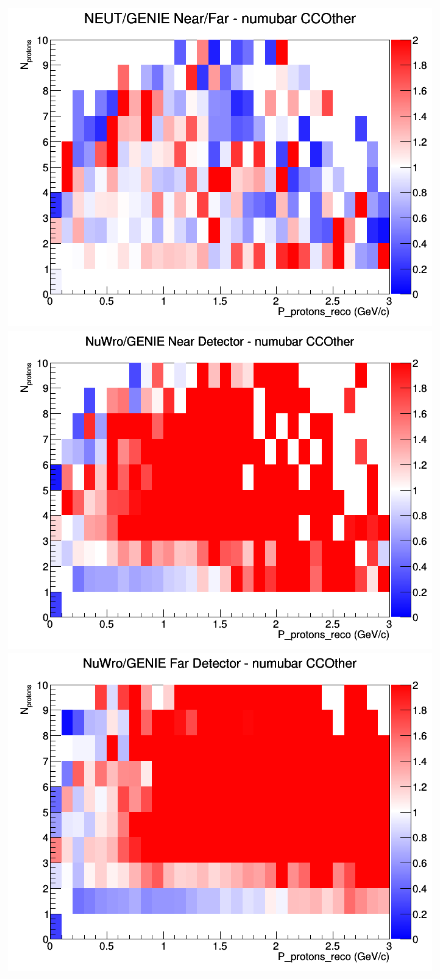 \documentclass[12pt]{article}
\begin{document}
\begin{figure}[h]
\endminipage
{}
\includegraphics[width=\linewidth]{eff_N_P/LAr/protons/ratios/CCOther_NEUT_GENIE_numubar_NF_N_P.png}
\endminipage
\newline
{}
\includegraphics[width=\linewidth]{eff_N_P/LAr/protons/ratios/CCOther_NuWro_GENIE_numubar_near_N_P.png}
\endminipage
{}
\includegraphics[width=\linewidth]{eff_N_P/LAr/protons/ratios/CCOther_NuWro_GENIE_numubar_far_N_P.png}

\end{figure}
\end{document}

